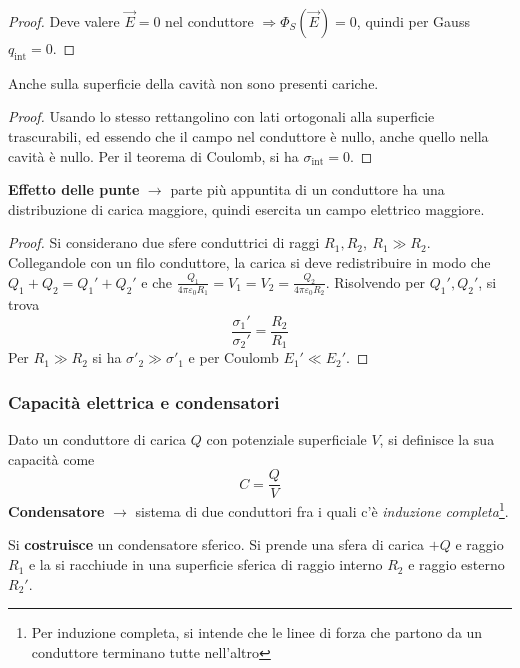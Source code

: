 \documentclass[10pt, a4paper]{scrartcl}
\numberwithin{equation}{subsection}
\theoremstyle{style1}
\newenvironment{boxenv}[1][]{
    \begin{eqbox}[#1]
    }{
   \end{eqbox}
}
\begin{document}
\begin{boxenv}[]
\begin{proof}
	Deve valere $\vec{E}=0$ nel conduttore $\Rightarrow \Phi_S(\vec{E})=0$, quindi per Gauss $q_\text{int} = 0$.
\end{proof}
\end{boxenv}
\noindent Anche sulla superficie della cavit\`a non sono presenti cariche.
\begin{boxenv}[]
\begin{proof}
	Usando lo stesso rettangolino con lati ortogonali alla superficie trascurabili, ed essendo che il campo nel conduttore \`e nullo, anche quello nella cavit\`a \`e nullo. Per il teorema di Coulomb, si ha $\sigma_\text{int}=0$.
\end{proof}
\end{boxenv}
\noindent \textbf{Effetto delle punte} $\to$ parte pi\`u appuntita di un conduttore ha una distribuzione di carica maggiore, quindi esercita un campo elettrico maggiore. 
\begin{boxenv}[]
\begin{proof}
	Si considerano due sfere conduttrici di raggi $R_1, R_2 , \ R_1 \gg R_2$. Collegandole con un filo conduttore, la carica si deve redistribuire in modo che $Q_1 + Q_2 = Q_1' +Q_2'$ e che $\frac{Q_1}{4\pi \varepsilon _0R_1}=V_1 = V_2=\frac{Q_2}{4\pi \varepsilon _0 R_2}$. Risolvendo per $Q_1', Q_2'$, si trova 
	\begin{equation}
		\frac{\sigma _1' }{\sigma_2'}= \frac{R_2}{R_1}
	\end{equation}
	Per $R_1\gg R_2$ si ha $\sigma '_2\gg\sigma '_1$ e per Coulomb $E_1' \ll E_2'$.
\end{proof}
\end{boxenv}

\subsubsection{Capacit\`a elettrica e condensatori}
Dato un conduttore di carica $Q$ con potenziale superficiale $V$, si definisce la sua capacit\`a come
\begin{equation}
	C = \frac{Q}{V}
\end{equation}
\textbf{Condensatore} $\to$ sistema di due conduttori fra i quali c'\`e \textit{induzione completa}\footnote{Per induzione completa, si intende che le linee di forza che partono da un conduttore terminano tutte nell'altro}.

Si \textbf{costruisce} un condensatore sferico. Si prende una sfera di carica $+Q$ e raggio $R_1$ e la si racchiude in una superficie sferica di raggio interno $R_2$ e raggio esterno $R_2'$.
\end{document}
